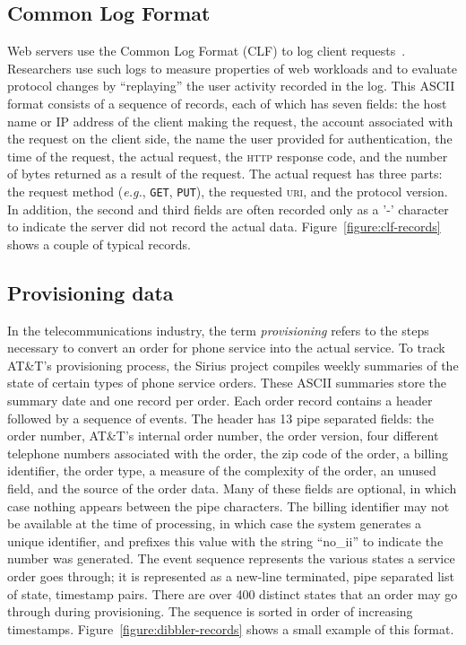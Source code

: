 \documentclass{sigplanconf}
\newcommand{\dibbler}{Sirius}
\newcommand{\figref}[1]{Figure~\ref{#1}}
\newcommand{\eg}{{\em e.g.}}
\begin{document}
\subsection{Common Log Format}
Web servers use the Common Log Format (CLF) to log client
requests~\cite{wpp}.  Researchers use such logs to measure
properties of web workloads and to evaluate protocol changes
by ``replaying'' the user activity recorded in the log.
This ASCII format consists of a sequence of
records, each of which has seven fields: the host name or IP address
of the client making the request, the account associated with the
request on the client side, the name the user provided for
authentication, the time of the request, the actual request, the
\textsc{http} response code, and the number of bytes returned as a
result of the request.  The actual request has three parts: the
request method (\eg, \texttt{GET}, \texttt{PUT}), the requested
\textsc{uri}, and the protocol version.  In addition, the second and
third fields are often recorded only as a '-' character to indicate
the server did not record the actual data.  \figref{figure:clf-records}
shows a couple of typical records.


\subsection{Provisioning data}
In the telecommunications industry, the term \textit{provisioning} refers to the steps necessary to convert an order for phone service into the actual 
service.  
To track AT\&T's provisioning process, the \dibbler{} project compiles
weekly summaries of the state of certain types of phone service orders.  
These ASCII summaries store the summary date and one record per order.
Each order record contains a header followed by a sequence of events.
The header has 13 pipe separated fields: the order number, AT\&T's
internal order number, the order version, four different telephone
numbers associated with the order, the zip code of the order, a
billing identifier, the order type, a measure of the complexity of the
order, an unused field, and the source of the order data.  Many of
these fields are optional, in which case nothing appears between the
pipe characters.  The billing identifier may not be available at the
time of processing, in which case the system generates a unique
identifier, and prefixes this value with the string ``no\_ii'' to
indicate the number was generated. The event sequence represents the
various states a service order goes through; it is represented as a
new-line terminated, pipe separated list of state, timestamp pairs.
There are over 400 distinct states that an order may go through during
provisioning.  The sequence is sorted in order of increasing timestamps. \figref{figure:dibbler-records} shows a small example of
this format.
\end{document}
